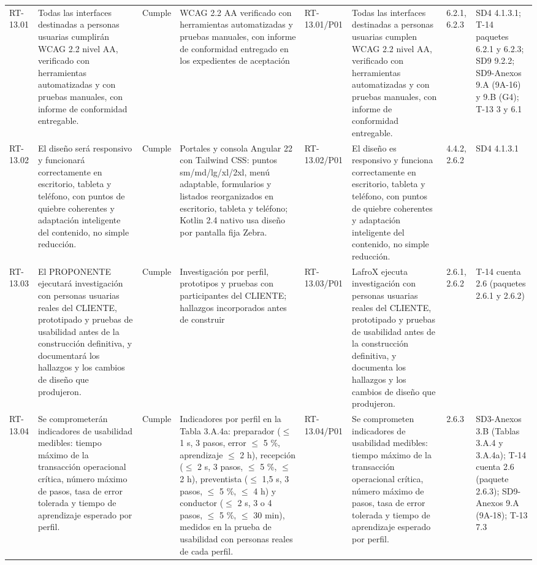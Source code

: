 \documentclass[oficio,firma,final]{lafrox}
\begin{document}
\begin{landscape}
{\begin{longtable}{@{}F{0.054} F{0.173} F{0.061} F{0.191} F{0.106} F{0.180} F{0.067} F{0.168}@{}}
  RT-13.01 & Todas las interfaces destinadas a personas usuarias cumplirán WCAG 2.2 nivel AA, verificado con herramientas automatizadas y con pruebas manuales, con informe de conformidad entregable. & Cumple & WCAG 2.2 AA verificado con herramientas automatizadas y pruebas manuales, con informe de conformidad entregado en los expedientes de aceptación & RT-13.01/\allowbreak{}P01 & Todas las interfaces destinadas a personas usuarias cumplen WCAG 2.2 nivel AA, verificado con herramientas automatizadas y con pruebas manuales, con informe de conformidad entregable. & 6.2.1, 6.2.3 & SD4 4.1.3.1; T-14 paquetes 6.2.1 y 6.2.3; SD9 9.2.2; SD9-Anexos 9.A (9A-16) y 9.B (G4); T-13 3 y 6.1  \\
  RT-13.02 & El diseño será responsivo y funcionará correctamente en escritorio, tableta y teléfono, con puntos de quiebre coherentes y adaptación inteligente del contenido, no simple reducción. & Cumple & Portales y consola Angular 22 con Tailwind CSS: puntos sm/md/lg/xl/2xl, menú adaptable, formularios y listados reorganizados en escritorio, tableta y teléfono; Kotlin 2.4 nativo usa diseño por pantalla fija Zebra. & RT-13.02/\allowbreak{}P01 & El diseño es responsivo y funciona correctamente en escritorio, tableta y teléfono, con puntos de quiebre coherentes y adaptación inteligente del contenido, no simple reducción. & 4.4.2, 2.6.2 & SD4 4.1.3.1  \\
  RT-13.03 & El PROPONENTE ejecutará investigación con personas usuarias reales del CLIENTE, prototipado y pruebas de usabilidad antes de la construcción definitiva, y documentará los hallazgos y los cambios de diseño que produjeron. & Cumple & Investigación por perfil, prototipos y pruebas con participantes del CLIENTE; hallazgos incorporados antes de construir & RT-13.03/\allowbreak{}P01 & LafroX ejecuta investigación con personas usuarias reales del CLIENTE, prototipado y pruebas de usabilidad antes de la construcción definitiva, y documenta los hallazgos y los cambios de diseño que produjeron. & 2.6.1, 2.6.2 & T-14 cuenta 2.6 (paquetes 2.6.1 y 2.6.2)  \\
  RT-13.04 & Se comprometerán indicadores de usabilidad medibles: tiempo máximo de la transacción operacional crítica, número máximo de pasos, tasa de error tolerada y tiempo de aprendizaje esperado por perfil. & Cumple & Indicadores por perfil en la Tabla 3.A.4a: preparador ($\leq$ 1 s, 3 pasos, error $\leq$ 5 \%, aprendizaje $\leq$ 2 h), recepción ($\leq$ 2 s, 3 pasos, $\leq$ 5 \%, $\leq$ 2 h), preventista ($\leq$ 1,5 s, 3 pasos, $\leq$ 5 \%, $\leq$ 4 h) y conductor ($\leq$ 2 s, 3 o 4 pasos, $\leq$ 5 \%, $\leq$ 30 min), medidos en la prueba de usabilidad con personas reales de cada perfil. & RT-13.04/\allowbreak{}P01 & Se comprometen indicadores de usabilidad medibles: tiempo máximo de la transacción operacional crítica, número máximo de pasos, tasa de error tolerada y tiempo de aprendizaje esperado por perfil. & 2.6.3 & SD3-Anexos 3.B (Tablas 3.A.4 y 3.A.4a); T-14 cuenta 2.6 (paquete 2.6.3); SD9-Anexos 9.A (9A-18); T-13 7.3  \\

\end{longtable}}
\end{landscape}
\end{document}
